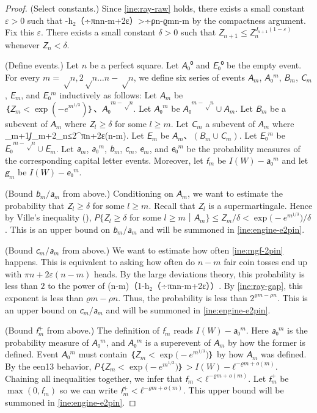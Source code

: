 \documentclass[openany]{amsbook}
\makeatletter
\numberwithin{equation}{chapter}
\numberwithin{figure}{chapter}
\numberwithin{table}{chapter}
\def\bigl@C#1{\bigl#1}					\def\bigr@C#1{\bigr#1}
\def\({\bigl@C(}	\def\){\bigr@C)}	令（{\Bigl(}			令）{\Bigr)}
\def\[#1\]{\begin{equation*}{#1}\end{equation*}}
\theoremstyle{definition}	理dfn:Definition~?s			理exa:Example~?s
\theoremstyle{remark}		理cla:Claim~?s				理rem:Remark~?s
\makeatother
\begin{document}
	\begin{proof}
		(Select constants.)
		Since \cref{ine:ray-raw} holds, there exists a small constant $ε>0$ such that
		\[1-h₂（÷{πn}{n-m}+2ε）>÷{ρn-ϱm}{n-m}\label{ine:ray-gap}\]
		by the compactness argument.
		Fix this $ε$.
		There exists a small constant $δ>0$ such that
		$𝘡_{n+1}≤𝘡_n^{𝘑_{n+1}(1-ε)}$ whenever $𝘡_n<δ$.
		
		(Define events.)
		Let $n$ be a perfect square.
		Let $𝘈₀⁰$ and $𝘌₀⁰$ be the empty event.
		For every $m=√n,2√n…n-√n$, we define six series of events
		$𝘈_m$, $𝘈₀^m$, $𝘉_m$, $𝘊_m$, $𝘌_m$, and $𝘌₀^m$
		inductively as follows:
		Let $𝘈_m$ be $｛𝘡_m<\exp(-e^{m^{1/3}})｝、𝘈₀^{m-√n}$.
		Let $𝘈₀^m$ be $𝘈₀^{m-√n}∪𝘈_m$.
		Let $𝘉_m$ be a subevent of $𝘈_m$ where $𝘡_l≥δ$ for some $l≥m$.
		Let $𝘊_m$ a subevent of $𝘈_m$ where
		\[𝘑_{m+1}𝘑_{m+2}_n≤2^{πn+2ε(n-m)}.\label{ine:mgf-2pin}\]
		Let $𝘌_m$ be $𝘈_m、(𝘉_m∪𝘊_m)$.
		Let $𝘌₀^m$ be $𝘌₀^{m-√n}∪𝘌_m$.
		Let $𝘢_m$, $𝘢₀^m$, $𝘣_m$, $𝘤_m$, $𝘦_m$, and $𝘦₀^m$
		be the probability measures of the corresponding capital letter events.
		Moreover, let $𝘧_m$ be $I(W)-𝘢₀^m$ and let $𝘨_m$ be $I(W)-𝘦₀^m$.
		
		(Bound $𝘣_m/𝘢_m$ from above.)
		Conditioning on $𝘈_m$, we want to estimate
		the probability that $𝘡_l≥δ$ for some $l≥m$.
		Recall that $𝘡_l$ is a supermartingale.
		Hence by Ville's inequality (\cite[Exercise~4.8.2]{Durrett19}),
		$𝘗\{𝘡_l≥δ$ for some $l≥m｜𝘈_m\}≤𝘡_m/δ<\exp\(-e^{m^{1/3}}\)/δ$.
		This is an upper bound on $𝘣_m/𝘢_m$
		and will be summoned in \cref{ine:engine-e2pin}.
		
		(Bound $𝘤_m/𝘢_m$ from above.)
		We want to estimate how often \cref{ine:mgf-2pin} happens.
		This is equivalent to asking how often do $n-m$
		fair coin tosses end up with $πn+2ε(n-m)$ heads.
		By the large deviations theory,
		this probability is less than $2$ to the power of
		\[-(n-m)（1-h₂（÷{πn}{n-m}+2ε））.\]
		By \cref{ine:ray-gap}, this exponent is less than $ϱm-ρn$.
		Thus, the probability is less than $2^{ϱm-ρn}$.
		This is an upper bound on $𝘤_m/𝘢_m$
		and will be summoned in \cref{ine:engine-e2pin}.
		
		(Bound $𝘧_m^+$ from above.)
		The definition of $𝘧_m$ reads $I(W)-𝘢₀^m$.
		Here $𝘢₀^m$ is the probability measure of $𝘈₀^m$,
		and $𝘈₀^m$ is a superevent of $𝘈_m$ by how the former is defined.
		Event $𝘈₀^m$ must contain $｛𝘡_m<\exp\(-e^{m^{1/3}}\)｝$
		by how $𝘈_m$ was defined.
		By the een13 behavior, $𝘗｛𝘡_m<\exp\(-e^{m^{1/3}}\)｝>I(W)-ℓ^{-ϱm+o(m)}$.
		Chaining all inequalities together, we infer that $𝘧_m<ℓ^{-ϱm+o(m)}$.
		Let $𝘧_m^+$ be $\max(0,𝘧_m)$ so
		we can write $𝘧_m^+<ℓ^{-ϱm+o(m)}$.
		This upper bound will be summoned in \cref{ine:engine-e2pin}.
		

\end{proof}
\end{document}
